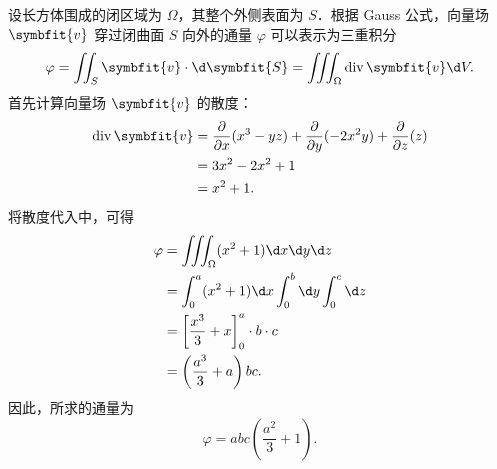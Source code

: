 \begin{solution}
    设长方体围成的闭区域为 $\Omega$，其整个外侧表面为 $S$．根据 Gauss 公式，向量场 $\symbfit{v}$ 穿过闭曲面 $S$ 向外的通量 $\varphi$ 可以表示为三重积分
    \begin{equation}
        \varphi = \iint_S \symbfit{v} \cdot \d \symbfit{S} = \iiint_{\Omega} \operatorname{div} \symbfit{v} \d V. \label{eq:gauss-1}
    \end{equation}
    首先计算向量场 $\symbfit{v}$ 的散度：
    \begin{equation}
        \begin{aligned}
            \operatorname{div} \symbfit{v} & = \frac{\partial}{\partial x} (x^3 - yz) + \frac{\partial}{\partial y} (-2x^2y) + \frac{\partial}{\partial z} (z) \\
                                           & = 3x^2 - 2x^2 + 1                                                                                                 \\
                                           & = x^2 + 1.
        \end{aligned}
    \end{equation}
    将散度代入中，可得
    \begin{equation}
        \begin{aligned}
            \varphi & = \iiint_{\Omega} (x^2 + 1) \d x \d y \d z             \\
                 & = \int_0^a (x^2 + 1) \d x \int_0^b \d y \int_0^c \d z  \\
                 & = \left[ \frac{x^3}{3} + x \right]_0^a \cdot b \cdot c \\
                 & = \left( \frac{a^3}{3} + a \right) bc.
        \end{aligned}
    \end{equation}
    因此，所求的通量为
    \begin{equation}
        \varphi = \boxed{abc \left( \frac{a^2}{3} + 1 \right)}.
    \end{equation}
\end{solution}

\endinput
